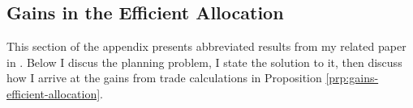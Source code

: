 \documentclass[12pt,pdftex]{article}
\begin{document}
\begin{onehalfspacing}
%
%

\newpage

\section{Gains in the Efficient Allocation}\label{sec:apx-planner}

This section of the appendix presents abbreviated results from my related paper in \citet{waughoptimal}. Below I discus the planning problem, I state the solution to it, then discuss how I arrive at the gains from trade calculations in Proposition \ref{prp:gains-efficient-allocation}.


\end{onehalfspacing}
\end{document}
